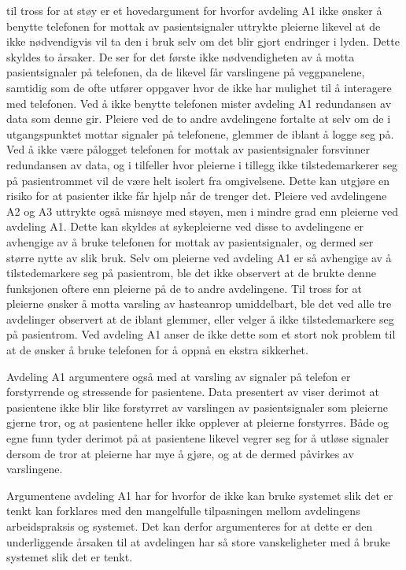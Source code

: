 \noindent 
til tross for at støy er et hovedargument for hvorfor avdeling A1 ikke ønsker å benytte telefonen for mottak av pasientsignaler uttrykte pleierne likevel at de ikke nødvendigvis vil ta den i bruk selv om det blir gjort endringer i lyden. Dette skyldes to årsaker. De ser for det første ikke nødvendigheten av å motta pasientsignaler på telefonen, da de likevel får varslingene på veggpanelene, samtidig som de ofte utfører oppgaver hvor de ikke har mulighet til å interagere med telefonen. Ved å ikke benytte telefonen mister avdeling A1 redundansen av data som denne gir.
Pleiere ved de to andre avdelingene fortalte at selv om de i utgangspunktet mottar signaler på telefonene, glemmer de iblant å logge seg på. Ved å ikke være pålogget telefonen for mottak av pasientsignaler forsvinner redundansen av data, og i tilfeller hvor pleierne i tillegg ikke tilstedemarkerer seg på pasientrommet vil de være helt isolert fra omgivelsene. Dette kan utgjøre en risiko for at pasienter ikke får hjelp når de trenger det. Pleiere ved avdelingene A2 og A3 uttrykte også misnøye med støyen, men i mindre grad enn pleierne ved avdeling A1. Dette kan skyldes at sykepleierne ved disse to avdelingene er avhengige av å bruke telefonen for mottak av pasientsignaler, og dermed ser større nytte av slik bruk. Selv om pleierne ved avdeling A1 er så avhengige av å tilstedemarkere seg på pasientrom, ble det ikke observert at de brukte denne funksjonen oftere enn pleierne på de to andre avdelingene. Til tross for at pleierne ønsker å motta varsling av hasteanrop umiddelbart, ble det ved alle tre avdelinger observert at de iblant glemmer, eller velger å ikke tilstedemarkere seg på pasientrom. Ved avdeling A1 anser de ikke dette som et stort nok problem til at de ønsker å bruke telefonen for å oppnå en ekstra sikkerhet. 

\noindent
Avdeling A1 argumentere også med at varsling av signaler på telefon er forstyrrende og stressende for pasientene. Data presentert av \citet{Rygh13} viser derimot at pasientene ikke blir like forstyrret av varslingen av pasientsignaler som pleierne gjerne tror, og at pasientene heller ikke opplever at pleierne forstyrres. Både \citet{Rygh13} og egne funn tyder derimot på at pasientene likevel vegrer seg for å utløse signaler dersom de tror at pleierne har mye å gjøre, og at de dermed påvirkes av varslingene.

\noindent
Argumentene avdeling A1 har for hvorfor de ikke kan bruke systemet slik det er tenkt kan forklares med den mangelfulle tilpasningen mellom avdelingens arbeidspraksis og systemet. Det kan derfor argumenteres for at dette er den underliggende årsaken til at avdelingen har så store vanskeligheter med å bruke systemet slik det er tenkt. 

